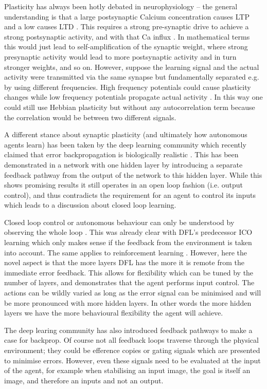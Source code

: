 \documentclass{llncs}
\begin{document}
Plasticity has always been hotly debated in neurophysiology -- the
general understanding is that a large postsynaptic Calcium
concentration causes LTP \cite{Malenka99,Bennett2000} and a low causes LTD
\cite{Mulkey1992}. This requires a strong pre-synaptic drive
to achieve a strong postsynaptic activity, and with that Ca influx
\cite{Meunier2017}. In mathematical terms this would just lead to
self-amplification of the synaptic weight, where strong presynaptic
activity would lead to more postsynaptic activity and in turn stronger
weights, and so on. However, suppose the learning signal and the actual
activity were transmitted via the same synapse but fundamentally
separated \cite{Lindsay2017} e.g. by using different
frequencies. High frequency potentials could cause
plasticity changes while low frequency potentials propagate
actual activity \cite{Canolty2010}. In this way one could still use
Hebbian plasticity but without any autocorrelation term because the
correlation would be between two different signals.

A different stance about synaptic plasticity (and ultimately how
autonomous agents learn) has been taken by the deep learning community
which recently claimed that error backpropagation is biologically
realistic \cite{Lillicrap2016,Roelfsema2018}. This has been
demonstrated in a network with one hidden layer by introducing a
separate feedback pathway from the output of the network to this
hidden layer. While this shows promising results it still operates in
an open loop fashion (i.e. output control), and thus contradicts the
requirement for an agent to control its inputs which leads to a
discussion about closed loop learning.

Closed loop control or autonomous behaviour can only be understood by
observing the whole loop \cite{Porr2005kyb}. This was already clear with DFL's
predecessor ICO learning \cite{Porr2006ICO} which only makes sense if the
feedback from the environment is taken into account. The same applies
to reinforcement learning \cite{Sutton98}. However, here the
novel aspect is that the more layers DFL has the more it is
remote from the immediate error feedback. This allows for
flexibility which can be tuned by the number of layers, and demonstrates
that the agent performs input control. The actions can be wildly
varied as long as the error signal can be minimised and will
be more pronounced with more hidden layers. In other words
the more hidden layers we have the more behavioural flexibility
the agent will achieve.

The deep learing community has also introduced feedback pathways to make a case for backprop. Of course not all feedback loops traverse through the physical environment; they could be
efference copies \cite{Uexkuell26,Graesser86} or gating signals which are presented 
to minimise errors. However, even these signals need to be evaluated
at the input of the agent, for example when stabilising an input image, the goal is itself an image, and therefore an inputs and not an output.








\end{document}
